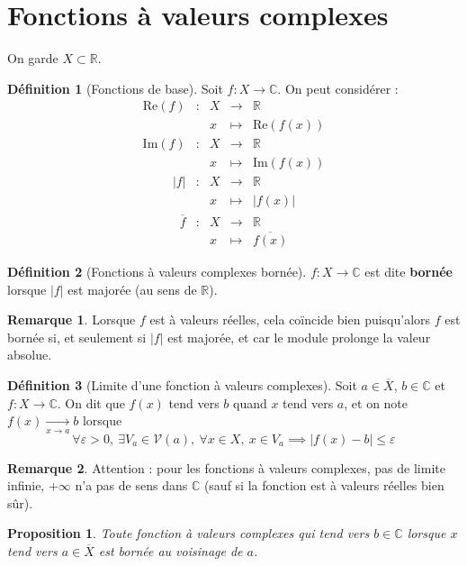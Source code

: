 \documentclass[french]{book}
\newcommand{\R}{\mathbb{R}}
\newcommand{\C}{\mathbb{C}}
\theoremstyle{plain}
\newtheorem{prop}{Proposition}[chapter]
\theoremstyle{definition}
\newtheorem{dfn}{Définition}[chapter]
\newtheorem{rmq}{Remarque}[chapter]
\theoremstyle{remark}
\begin{document}
\section{Fonctions à valeurs complexes}
On garde $X\subset\R$.
\begin{dfn}[Fonctions de base]
	Soit $f:X\rightarrow\C$. On peut considérer : $$\begin{array}{ccccc}\text{Re}(f)&:&X&\rightarrow&\R\\&&x&\mapsto&\text{Re}(f(x))\end{array}$$ $$\begin{array}{ccccc}\text{Im}(f)&:&X&\rightarrow&\R\\&&x&\mapsto&\text{Im}(f(x))\end{array}$$
	$$\begin{array}{ccccc}\lvert f\rvert&:&X&\rightarrow&\R\\&&x&\mapsto&\lvert f(x)\rvert\end{array}$$
	$$\begin{array}{ccccc}\overline{f}&:&X&\rightarrow&\R\\&&x&\mapsto&\overline{f(x)}\end{array}$$
\end{dfn}
\begin{dfn}[Fonctions à valeurs complexes bornée]
	$f:X\rightarrow\C$ est dite \textbf{bornée} lorsque $\lvert f\rvert$ est majorée (au sens de $\R$).
\end{dfn}
\begin{rmq}
	Lorsque $f$ est à valeurs réelles, cela coïncide bien puisqu'alors $f$ est bornée si, et seulement si $\lvert f\rvert$ est majorée, et car le module prolonge la valeur absolue.
\end{rmq}
\begin{dfn}[Limite d'une fonction à valeurs complexes]
	Soit $a\in\overline{X}$, $b\in\C$ et $f:X\rightarrow\C$. On dit que $f(x)$ tend vers $b$ quand $x$ tend vers $a$, et on note $f(x)\xrightarrow[x\to a]{}b$ lorsque $$\forall\varepsilon>0,\ \exists V_a\in\mathcal{V}(a),\ \forall x\in X,\ x\in V_a\implies \lvert f(x)-b\rvert\leqslant\varepsilon$$
\end{dfn}
\begin{rmq}
	Attention : pour les fonctions à valeurs complexes, pas de limite infinie, $+\infty$ n'a pas de sens dans $\C$ (sauf si la fonction est à valeurs réelles bien sûr).
\end{rmq}
\begin{prop}
	Toute fonction à valeurs complexes qui tend vers $b\in\C$ lorsque $x$ tend vers $a\in\overline{X}$ est bornée au voisinage de $a$.
\end{prop}
\end{document}
